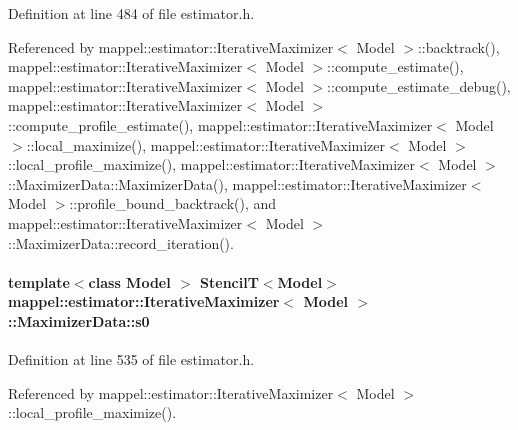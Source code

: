 Definition at line 484 of file estimator.\+h.



Referenced by mappel\+::estimator\+::\+Iterative\+Maximizer$<$ Model $>$\+::backtrack(), mappel\+::estimator\+::\+Iterative\+Maximizer$<$ Model $>$\+::compute\+\_\+estimate(), mappel\+::estimator\+::\+Iterative\+Maximizer$<$ Model $>$\+::compute\+\_\+estimate\+\_\+debug(), mappel\+::estimator\+::\+Iterative\+Maximizer$<$ Model $>$\+::compute\+\_\+profile\+\_\+estimate(), mappel\+::estimator\+::\+Iterative\+Maximizer$<$ Model $>$\+::local\+\_\+maximize(), mappel\+::estimator\+::\+Iterative\+Maximizer$<$ Model $>$\+::local\+\_\+profile\+\_\+maximize(), mappel\+::estimator\+::\+Iterative\+Maximizer$<$ Model $>$\+::\+Maximizer\+Data\+::\+Maximizer\+Data(), mappel\+::estimator\+::\+Iterative\+Maximizer$<$ Model $>$\+::profile\+\_\+bound\+\_\+backtrack(), and mappel\+::estimator\+::\+Iterative\+Maximizer$<$ Model $>$\+::\+Maximizer\+Data\+::record\+\_\+iteration().

\paragraph[{\texorpdfstring{s0}{s0}}]{\setlength{\rightskip}{0pt plus 5cm}template$<$class Model $>$ {\bf StencilT}$<$Model$>$ {\bf mappel\+::estimator\+::\+Iterative\+Maximizer}$<$ Model $>$\+::Maximizer\+Data\+::s0\hspace{0.3cm}{\ttfamily [protected]}}\hypertarget{classmappel_1_1estimator_1_1IterativeMaximizer_1_1MaximizerData_a10660729fb16b8b8ab4f719562e5b87c}{}\label{classmappel_1_1estimator_1_1IterativeMaximizer_1_1MaximizerData_a10660729fb16b8b8ab4f719562e5b87c}


Definition at line 535 of file estimator.\+h.



Referenced by mappel\+::estimator\+::\+Iterative\+Maximizer$<$ Model $>$\+::local\+\_\+profile\+\_\+maximize().

